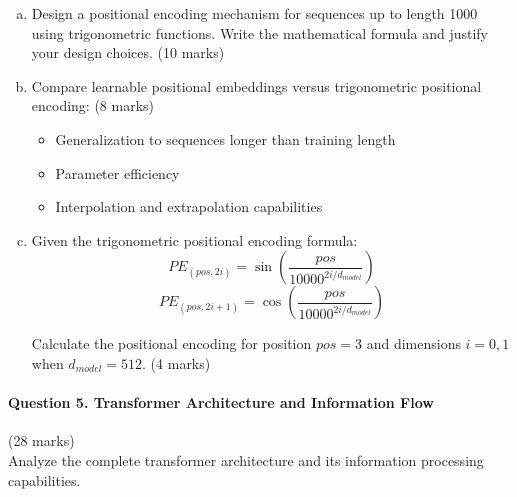 \documentclass[12pt]{article}
\newcommand{\shortanswer}{\vspace{2cm}}          %
\newcommand{\mediumanswer}{\vspace{3cm}}         %
\begin{document}
\begin{enumerate}[(a)]
    \item Design a positional encoding mechanism for sequences up to length 1000 using trigonometric functions. Write the mathematical formula and justify your design choices. \hfill (10 marks)
    
    \mediumanswer
    
    \item Compare learnable positional embeddings versus trigonometric positional encoding: \hfill (8 marks)
    \begin{itemize}
        \item Generalization to sequences longer than training length
        \item Parameter efficiency
        \item Interpolation and extrapolation capabilities
    \end{itemize}
    
    \mediumanswer
    
    \item Given the trigonometric positional encoding formula:
    $$PE_{(pos,2i)} = \sin\left(\frac{pos}{10000^{2i/d_{model}}}\right)$$
    $$PE_{(pos,2i+1)} = \cos\left(\frac{pos}{10000^{2i/d_{model}}}\right)$$
    
    Calculate the positional encoding for position $pos = 3$ and dimensions $i = 0, 1$ when $d_{model} = 512$. \hfill (4 marks)
    
    \shortanswer
\end{enumerate}

\newpage
\paragraph{Question 5. Transformer Architecture and Information Flow}\hfill (28 marks)\\
Analyze the complete transformer architecture and its information processing capabilities.
\end{document}

